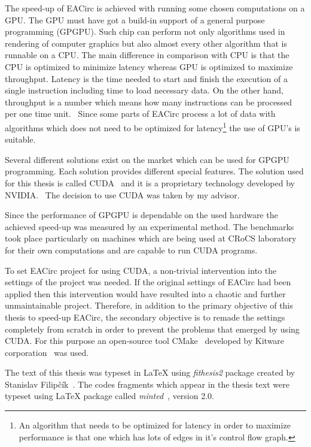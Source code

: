\documentclass[12pt,twoside]{fithesis2}
\begin{document}
The speed-up of EACirc is achieved with running some chosen computations on a GPU. The GPU must have got a build-in support of a general purpose programming (GPGPU). Such chip can perform not only algorithms used in rendering of computer graphics but also almost every other algorithm that is runnable on a CPU. The main difference in comparison with CPU is that the CPU is optimized to minimize latency whereas GPU is optimized to maximize throughput. Latency is the time needed to start and finish the execution of a single instruction including time to load necessary data. On the other hand, throughput\label{throughput} is a number which means how many instructions can be processed per one time unit.~\cite{professional_cuda} Since some parts of EACirc process a lot of data with algorithms which does not need to be optimized for latency\footnote{An algorithm that needs to be optimized for latency in order to maximize performance is that one which has lots of edges in it's control flow graph.} the use of GPU's is suitable.

Several different solutions exist on the market which can be used for GPGPU programming. Each solution provides different special features. The solution used for this thesis is called CUDA~\cite{about_cuda} and it is a proprietary technology developed by NVIDIA.~\cite{nvidia} The decision to use CUDA was taken by my advisor.

Since the performance of GPGPU is dependable on the used hardware the achieved speed-up was measured by an experimental method. The benchmarks took place particularly on machines which are being used at CRoCS laboratory for their own computations and are capable to run CUDA programs.

\bigskip

To set EACirc project for using CUDA, a non-trivial intervention into the settings of the project was needed. If the original settings of EACirc had been applied then this intervention would have resulted into a chaotic and further unmaintainable project. Therefore, in addition to the primary objective of this thesis to speed-up EACirc, the secondary objective is to remade the settings completely from scratch in order to prevent the problems that emerged by using CUDA. For this purpose an open-source tool CMake~\cite{cmake} developed by Kitware corporation~\cite{kitware} was used.

\bigskip

The text of this thesis was typeset in \LaTeX{} using \textit{fithesis2} package created by Stanislav Filipčík~\cite{fithesis}. The codes fragments which appear in the thesis text were typeset using \LaTeX{} package called \textit{minted}~\cite{minted}, version 2.0.
\end{document}

